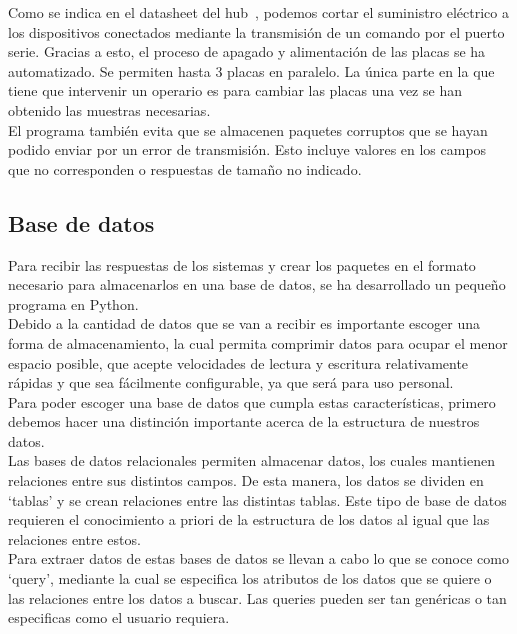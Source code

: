 \documentclass[spanish]{template/minim}
\begin{document}
Como se indica en el datasheet del hub~\cite{yepkit}, podemos cortar el suministro eléctrico a los dispositivos conectados mediante la transmisión de un comando por el puerto serie. Gracias a esto, el proceso de apagado y alimentación de las placas se ha automatizado. Se permiten hasta 3 placas en paralelo. La única parte en la que tiene que intervenir un operario es para cambiar las placas una vez se han obtenido las muestras necesarias.\\

El programa también evita que se almacenen paquetes corruptos que se hayan podido enviar por un error de transmisión. Esto incluye valores en los campos que no corresponden o respuestas de tamaño no indicado.\\

\subsection{Base de datos}\label{sec:database}

Para recibir las respuestas de los sistemas y crear los paquetes en el formato necesario para almacenarlos en una base de datos, se ha desarrollado un pequeño programa en Python.\\

Debido a la cantidad de datos que se van a recibir es importante escoger una forma de almacenamiento, la cual permita comprimir datos para ocupar el menor espacio posible, que acepte velocidades de lectura y escritura relativamente rápidas y que sea fácilmente configurable, ya que será para uso personal.\\

Para poder escoger una base de datos que cumpla estas características, primero debemos hacer una distinción importante acerca de la estructura de nuestros datos.\\

Las bases de datos relacionales permiten almacenar datos, los cuales mantienen relaciones entre sus distintos campos. De esta manera, los datos se dividen en `tablas' y se crean relaciones entre las distintas tablas. Este tipo de base de datos requieren el conocimiento a priori de la estructura de los datos al igual que las relaciones entre estos.\\

Para extraer datos de estas bases de datos se llevan a cabo lo que se conoce como `query', mediante la cual se especifica los atributos de los datos que se quiere o las relaciones entre los datos a buscar. Las queries pueden ser tan genéricas o tan especificas como el usuario requiera.\\
\end{document}
